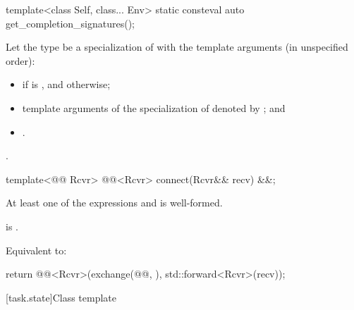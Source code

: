 %
\begin{itemdecl}
template<class Self, class... Env>
  static consteval auto get_completion_signatures();
\end{itemdecl}
\begin{itemdescr}
\pnum
Let the type  be a specialization
of 
with the template arguments (in unspecified order):
\begin{itemize}
\item
{} if  is ,
and  otherwise;
\item
template arguments of the specialization of
 denoted by ;
and
\item {}.
\end{itemize}

\pnum
\returns
{}.
\end{itemdescr}

%
\begin{itemdecl}
template<@@ Rcvr>
  @@<Rcvr> connect(Rcvr&& recv) &&;
\end{itemdecl}
\begin{itemdescr}
\pnum
\mandates
At least one of the expressions
 and
is well-formed.

\pnum
\expects
{} is .

\pnum
\effects
Equivalent to:
\begin{codeblock}
return @@<Rcvr>(exchange(@@, {}), std::forward<Rcvr>(recv));
\end{codeblock}
\end{itemdescr}

[task.state]{Class template }

